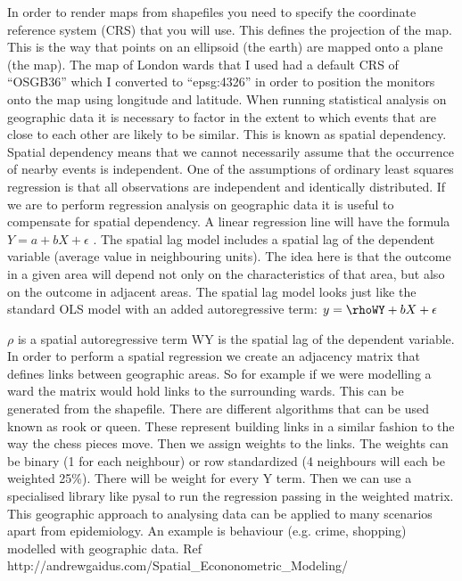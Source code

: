 In order to render maps from shapefiles you need to specify the coordinate reference system (CRS) that you will use. This defines the projection of the map. This is the way that points on an ellipsoid (the earth) are mapped onto a plane (the map). The map of London wards that I used had a default CRS of “OSGB36” which I converted to “epsg:4326” in order to position the monitors onto the map using longitude and latitude.
When running statistical analysis on geographic data it is necessary to factor in the extent to which events that are close to each other are likely to be similar. This is known as spatial dependency. Spatial dependency means that we cannot necessarily assume that the occurrence of nearby events is independent. 
One of the assumptions of ordinary least squares regression is that all observations are independent and identically distributed. If we are to perform regression analysis on geographic data it is useful to compensate for spatial dependency.
A linear regression line will have the formula $Y = a + bX  + \epsilon$  .
The spatial lag model includes a spatial lag of the dependent variable (average value in neighbouring units). The idea here is that the outcome in a given area will depend not only on the characteristics of that area, but also on the outcome in adjacent areas. The spatial lag model looks just like the standard OLS model with an added autoregressive term:
$y = \rhoWY +  bX  + \epsilon $


$\rho$ is a spatial autoregressive term WY is the spatial lag of the dependent variable.
 In order to perform a spatial regression we create an adjacency matrix that defines links between geographic areas. So for example if we were modelling a ward the matrix would hold links to the surrounding wards. This can be generated from the shapefile. There are different algorithms that can be used known as rook or queen. These represent building links in a similar fashion to the way the chess pieces move. Then we assign weights to the links. The weights can be binary (1 for each neighbour) or row standardized (4 neighbours will each be weighted 25\%). There will be weight for every Y term. Then we can use a specialised library like pysal to run the regression passing in the weighted matrix.
This geographic approach to analysing data can be applied to many scenarios apart from epidemiology. An example is behaviour (e.g. crime, shopping) modelled with geographic data.
Ref http://andrewgaidus.com/Spatial_Econonometric_Modeling/

